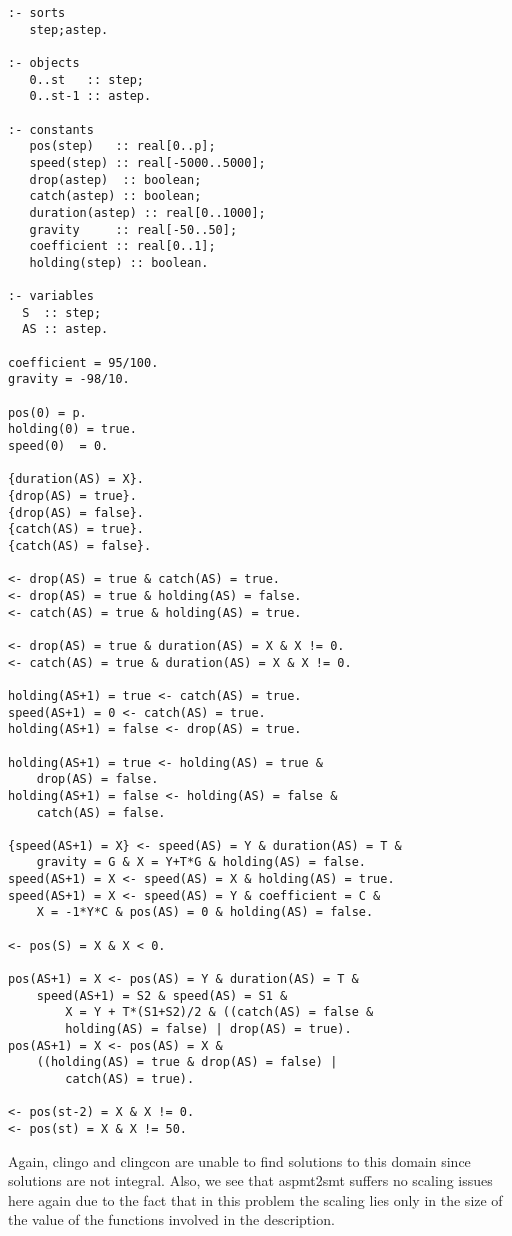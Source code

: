 \documentclass[runningheads]{llncs}
\begin{document}
\BOCC
\begin{lstlisting}
:- sorts
   step;astep.

:- objects
   0..st   :: step;
   0..st-1 :: astep.

:- constants
   pos(step)   :: real[0..p];
   speed(step) :: real[-5000..5000];
   drop(astep)  :: boolean;
   catch(astep) :: boolean;
   duration(astep) :: real[0..1000];
   gravity     :: real[-50..50];
   coefficient :: real[0..1];
   holding(step) :: boolean.

:- variables
  S  :: step;
  AS :: astep.

coefficient = 95/100.
gravity = -98/10.

pos(0) = p.
holding(0) = true.
speed(0)  = 0.

{duration(AS) = X}.
{drop(AS) = true}.
{drop(AS) = false}.
{catch(AS) = true}.
{catch(AS) = false}.

<- drop(AS) = true & catch(AS) = true.
<- drop(AS) = true & holding(AS) = false.
<- catch(AS) = true & holding(AS) = true.

<- drop(AS) = true & duration(AS) = X & X != 0.
<- catch(AS) = true & duration(AS) = X & X != 0.

holding(AS+1) = true <- catch(AS) = true.
speed(AS+1) = 0 <- catch(AS) = true.
holding(AS+1) = false <- drop(AS) = true.

holding(AS+1) = true <- holding(AS) = true & 
    drop(AS) = false.
holding(AS+1) = false <- holding(AS) = false & 
    catch(AS) = false.

{speed(AS+1) = X} <- speed(AS) = Y & duration(AS) = T & 
    gravity = G & X = Y+T*G & holding(AS) = false.
speed(AS+1) = X <- speed(AS) = X & holding(AS) = true.
speed(AS+1) = X <- speed(AS) = Y & coefficient = C & 
    X = -1*Y*C & pos(AS) = 0 & holding(AS) = false.

<- pos(S) = X & X < 0.

pos(AS+1) = X <- pos(AS) = Y & duration(AS) = T & 
    speed(AS+1) = S2 & speed(AS) = S1 &	
		X = Y + T*(S1+S2)/2 & ((catch(AS) = false & 
		holding(AS) = false) | drop(AS) = true).
pos(AS+1) = X <- pos(AS) = X & 
    ((holding(AS) = true & drop(AS) = false) | 
		catch(AS) = true).

<- pos(st-2) = X & X != 0.
<- pos(st) = X & X != 50.
\end{lstlisting}
\EOCC



Again, {\sc clingo} and {\sc clingcon} are unable to find solutions to this 
domain since solutions are not integral. Also, we see that {\sc aspmt2smt} suffers
no scaling issues here again due to the fact that in this problem the scaling lies 
only in the size of the value of the functions involved in the description.
\end{document}
